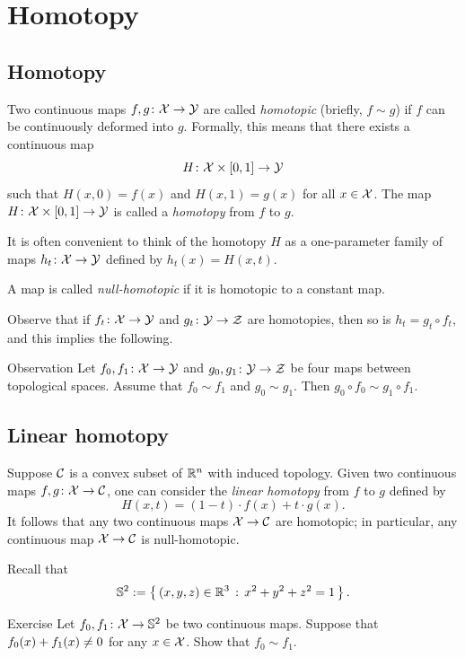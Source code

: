 \chapter{Homotopy}

\section{Homotopy}\label{sec:homotopy}

Two continuous maps $f,g\colon\mathcal{X}\to \mathcal{Y}$ are called {}\emph{homotopic} (briefly, $f\sim g$) if $f$ can be continuously deformed into $g$.
Formally, this means that there exists a continuous map
\[
H\colon\mathcal{X}\times[0,1]\to \mathcal{Y}
\]
such that $H(x,0)=f(x)$ and $H(x,1)=g(x)$ for all $x\in \mathcal{X}$.
The map $H\colon\mathcal{X}\times[0,1]\to \mathcal{Y}$ is called a \emph{homotopy} from $f$ to $g$.

It is often convenient to think of the homotopy $H$ as a one-parameter family of maps $h_t\colon\mathcal{X}\to \mathcal{Y}$ defined by $h_t(x)=H(x,t)$.

A map is called \emph{null-homotopic} if it is homotopic to a constant map.

Observe that if $f_t\colon\mathcal{X}\to\mathcal{Y}$ and $g_t\colon\mathcal{Y}\to \mathcal{Z}$ are homotopies,
then so is
$h_t=g_t\circ f_t$, and this implies the following.

\begin{thm}{Observation}\label{ex:comp-hom}
Let $f_0, f_1\colon\mathcal{X}\to\mathcal{Y}$ and $g_0,g_1\colon\mathcal{Y}\to \mathcal{Z}$ be
four maps between topological spaces.
Assume that $f_0\sim f_1$ and $g_0\sim g_1$.
Then $g_0\circ f_0\sim g_1\circ f_1$.
\end{thm}

\section{Linear homotopy}\label{sec:Linear homotopy}

Suppose $\mathcal{C}$ is a convex subset of $\mathbb{R}^n$ with induced topology.
Given two continuous maps $f,g\colon\mathcal{X}\to \mathcal{C}$, one can consider the \emph{linear homotopy} from $f$ to $g$ defined by
\[H(x,t)=(1-t)\cdot f(x)+t\cdot g(x).\]
It follows that any two continuous maps $\mathcal{X}\to\mathcal{C}$ are homotopic;
in particular, any continuous map $\mathcal{X}\to\mathcal{C}$ is null-homotopic.

Recall that
\[\mathbb{S}^2\mathrel{:=}\left\{\,{(x,y,z)\in\mathbb{R}^3}\,:\,{x^2+y^2+z^2=1}\,\right\}.\]

\begin{thm}{Exercise}\label{ex:homot-sphere}
Let $f_0, f_1\:\c{X}\z\to\SS^2$ be two continuous maps.
Suppose that $f_0(x)\z+f_1(x)\ne 0$ for any $x\in\mathcal{X}$.
Show that $f_0\sim f_1$.
\end{thm}



